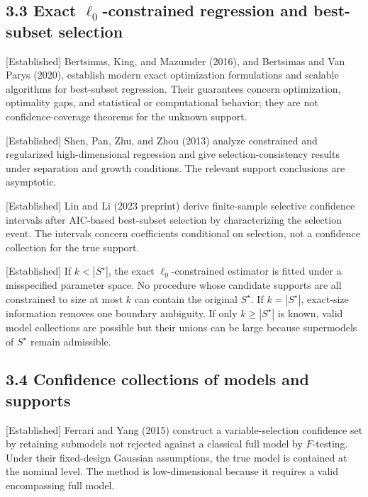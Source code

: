 \documentclass[
  english,
  11pt,
  a4paper,
]{article}
\begin{document}
\subsection{\texorpdfstring{3.3 Exact $\ell_0$-constrained regression
and best-subset
selection}{3.3 Exact \textbackslash ell\_0-constrained regression and best-subset selection}}\label{exact-ell_0-constrained-regression-and-best-subset-selection}

{[}Established{]} Bertsimas, King, and Mazumder (2016), and Bertsimas
and Van Parys (2020), establish modern exact optimization formulations
and scalable algorithms for best-subset regression. Their guarantees
concern optimization, optimality gaps, and statistical or computational
behavior; they are not confidence-coverage theorems for the unknown
support.

{[}Established{]} Shen, Pan, Zhu, and Zhou (2013) analyze constrained
and regularized high-dimensional regression and give
selection-consistency results under separation and growth conditions.
The relevant support conclusions are asymptotic.

{[}Established{]} Lin and Li (2023 preprint) derive finite-sample
selective confidence intervals after AIC-based best-subset selection by
characterizing the selection event. The intervals concern coefficients
conditional on selection, not a confidence collection for the true
support.

{[}Established{]} If $k<|S^\star|$, the exact $\ell_0$-constrained
estimator is fitted under a misspecified parameter space. No procedure
whose candidate supports are all constrained to size at most $k$ can
contain the original $S^\star$. If $k=|S^\star|$, exact-size
information removes one boundary ambiguity. If only $k\ge|S^\star|$ is
known, valid model collections are possible but their unions can be
large because supermodels of $S^\star$ remain admissible.

\subsection{3.4 Confidence collections of models and
supports}\label{confidence-collections-of-models-and-supports}

{[}Established{]} Ferrari and Yang (2015) construct a variable-selection
confidence set by retaining submodels not rejected against a classical
full model by $F$-testing. Under their fixed-design Gaussian
assumptions, the true model is contained at the nominal level. The
method is low-dimensional because it requires a valid encompassing full
model.
\end{document}

